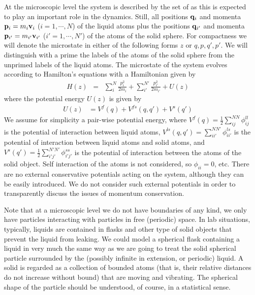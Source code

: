 \documentclass[b5paper,openright,11pt]{book}
\begin{document}
At the microscopic level the system is described  by the set of
as this is expected to play an important role in the dynamics. Still, all  positions  ${\bf  q}_i$  and  momenta  ${\bf  p}_i=m_i{\bf  v}_i$
($i=1,\cdots,N$) of the liquid atoms plus the positions ${\bf q}_{i'}$
and  momenta ${\bf  p}_{i'}=m_{i'}{\bf v}_{i'}$  ($i'=1,\cdots,N'$) of
the atoms  of the solid  sphere.  For  compactness we will  denote the
microstate in either  of the following forms $z$  or ${q,p,q',p'}$. We
will distinguish  with a prime  the labels of  the atoms of  the solid
sphere from the  unprimed labels of the liquid  atoms.  The microstate
of  the  system  evolves  according to  Hamilton's  equations  with  a
Hamiltonian given by
\begin{eqnarray}
H(z) &=& \sum^N_i \frac{p_i^2}{2m_i} + \sum^{N'}_{i'} \frac{p_{i'}^2}{2m_{i'}}
+ U(z)
\label{H}
\end{eqnarray}
where the potential energy $U(z)$ is given by
\begin{align}
U(z)&=  V^{f}(q)+ V^{fs}(q,q')+ V^{s}(q')
\end{align}
We  assume   for  simplicity  a  pair-wise   potential  energy,  where
$V^{f}(q)=\frac{1}{2}\sum^{{NN}}_{i   j}\phi^{ll}_{ij}$   is   the
potential  of  interaction  between   liquid  atoms,  $  V^{ls}(q,q')=
\sum^{NN'}_{ii'}\phi^{ls}_{ii'}$  is  the   potential  of  interaction
between   liquid   atoms   and   solid   atoms,   and   $   V^{s}(q')=
\frac{1}{2}\sum^{{N'N'}}_{i' j'}\phi^{ss}_{i'j'}$ is the potential
of  interaction  between   the  atoms  of  the   solid  object.   Self
interaction of  the atoms  is not  considered, so  $\phi_{ii}=0$, etc.
There are  no external conservative  potentials acting on  the system,
although  they can  be  easily  introduced. We  do  not consider  such
external potentials  in order to  transparently discuss the  issues of
momentum conservation.

Note that at a microscopic level we do not have boundaries of
  any kind, we only have particles interacting with particles in free
(periodic) space.  In lab  situations, typically, liquids are contained
in flasks and other type of  solid objects that prevent the liquid from
leaking.  We could model a spherical  flask containing a liquid in very
much  the same  way  as we  are  going to  treat  the solid  spherical
particle  surrounded  by  the  (possibly  infinite  in  extension,  or
periodic)  liquid. A solid is
  regarded as a collection of  bounded atoms (that is, their relative
distances  do  not  increase  without   bound)  that  are  moving  and
vibrating. The spherical  shape of the particle  should be understood,
of course, in a statistical sense.
\end{document}
